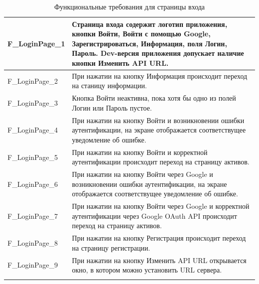 \documentclass[a4paper, 14pt]{article}
\begin{document}
\begin{longtable}{| p{} | p{} |}
    F\_LoginPage\_1                 & Страница входа содержит логотип приложения, кнопки Войти, Войти с помощью Google, Зарегистрироваться, Информация, поля Логин, Пароль. Dev-версия приложения допускает наличие кнопки Изменить API URL.                                                  \\ \hline
    F\_LoginPage\_2                 & При нажатии на кнопку Информация происходит переход на станицу информации.                                                                                                         \\ \hline
    F\_LoginPage\_3                 & Кнопка Войти неактивна, пока хотя бы одно из полей Логин или Пароль пустое.                                                                                                        \\ \hline
    F\_LoginPage\_4                 & При нажатии на кнопку Войти и возникновении ошибки аутентификации, на экране отображается соответствущее уведомление об ошибке.                                                    \\ \hline
    F\_LoginPage\_5                 & При нажатии на кнопку Войти и корректной аутентификации происходит переход на страницу активов.                                                                                    \\ \hline
    F\_LoginPage\_6                 & При нажатии на кнопку Войти через Google и возникновении ошибки аутентификации, на экране отображается соответствущее уведомление об ошибке.                                       \\ \hline
    F\_LoginPage\_7                 & При нажатии на кнопку Войти через Google и корректной аутентификации через Google OAuth API происходит переход на страницу активов.                                                \\ \hline
    F\_LoginPage\_8                 & При нажатии на кнопку Регистрация происходит переход на страницу регистрации.                                                                                                      \\ \hline
    F\_LoginPage\_9                 & При нажатии на кнопку Изменить API URL открывается окно, в котором можно установить URL сервера.                                                                                                      \\ \hline

    \caption{Функциональные требования для страницы входа}
\end{longtable}
\end{document}
